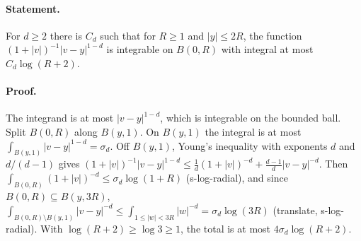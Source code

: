 \paragraph{Statement.} For $d\geq2$ there is $C_d$ such that for $R\geq1$ and $|y|\leq2R$, the function
$(1+|v|)^{-1}|v-y|^{1-d}$ is integrable on $B(0,R)$ with integral at most $C_d\log(R+2)$.
\paragraph{Proof.} The integrand is at most $|v-y|^{1-d}$, which is integrable on the bounded ball. Split
$B(0,R)$ along $B(y,1)$. On $B(y,1)$ the integral is at most $\int_{B(y,1)}|v-y|^{1-d}=\sigma_d$. Off
$B(y,1)$, Young's inequality with exponents $d$ and $d/(d-1)$ gives
$(1+|v|)^{-1}|v-y|^{1-d}\leq\frac1d(1+|v|)^{-d}+\frac{d-1}d|v-y|^{-d}$. Then
$\int_{B(0,R)}(1+|v|)^{-d}\leq\sigma_d\log(1+R)$ (s-log-radial), and since $B(0,R)\subseteq B(y,3R)$,
$\int_{B(0,R)\setminus B(y,1)}|v-y|^{-d}\leq\int_{1\leq|w|<3R}|w|^{-d}=\sigma_d\log(3R)$ (translate, s-log-radial).
With $\log(R+2)\geq\log3\geq1$, the total is at most $4\sigma_d\log(R+2)$.
